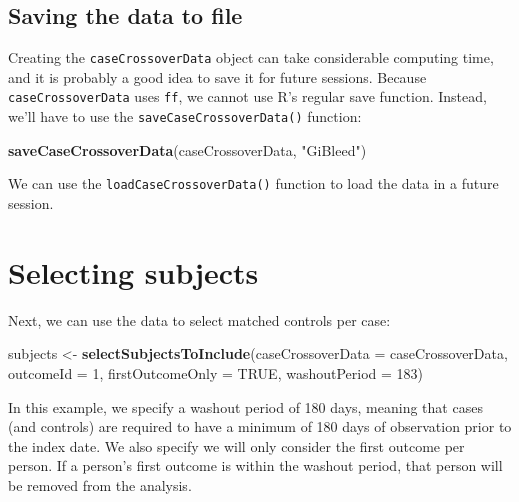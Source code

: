 \documentclass[]{article}
\newenvironment{Shaded}{\begin{snugshade}}{\end{snugshade}}
\newcommand{\DataTypeTok}[1]{\textcolor[rgb]{0.13,0.29,0.53}{#1}}
\newcommand{\DecValTok}[1]{\textcolor[rgb]{0.00,0.00,0.81}{#1}}
\newcommand{\KeywordTok}[1]{\textcolor[rgb]{0.13,0.29,0.53}{\textbf{#1}}}
\newcommand{\NormalTok}[1]{#1}
\newcommand{\OtherTok}[1]{\textcolor[rgb]{0.56,0.35,0.01}{#1}}
\newcommand{\StringTok}[1]{\textcolor[rgb]{0.31,0.60,0.02}{#1}}
\begin{document}
\hypertarget{saving-the-data-to-file}{%
\subsection{Saving the data to file}\label{saving-the-data-to-file}}

Creating the \texttt{caseCrossoverData} object can take considerable
computing time, and it is probably a good idea to save it for future
sessions. Because \texttt{caseCrossoverData} uses \texttt{ff}, we cannot
use R's regular save function. Instead, we'll have to use the
\texttt{saveCaseCrossoverData()} function:

\begin{Shaded}
\begin{Highlighting}[]
\KeywordTok{saveCaseCrossoverData}\NormalTok{(caseCrossoverData, }\StringTok{"GiBleed"}\NormalTok{)}
\end{Highlighting}
\end{Shaded}

We can use the \texttt{loadCaseCrossoverData()} function to load the
data in a future session.

\hypertarget{selecting-subjects}{%
\section{Selecting subjects}\label{selecting-subjects}}

Next, we can use the data to select matched controls per case:

\begin{Shaded}
\begin{Highlighting}[]
\NormalTok{subjects <-}\StringTok{ }\KeywordTok{selectSubjectsToInclude}\NormalTok{(}\DataTypeTok{caseCrossoverData =}\NormalTok{ caseCrossoverData,}
                                    \DataTypeTok{outcomeId =} \DecValTok{1}\NormalTok{,}
                                    \DataTypeTok{firstOutcomeOnly =} \OtherTok{TRUE}\NormalTok{,}
                                    \DataTypeTok{washoutPeriod =} \DecValTok{183}\NormalTok{)}
\end{Highlighting}
\end{Shaded}

In this example, we specify a washout period of 180 days, meaning that
cases (and controls) are required to have a minimum of 180 days of
observation prior to the index date. We also specify we will only
consider the first outcome per person. If a person's first outcome is
within the washout period, that person will be removed from the
analysis.
\end{document}
